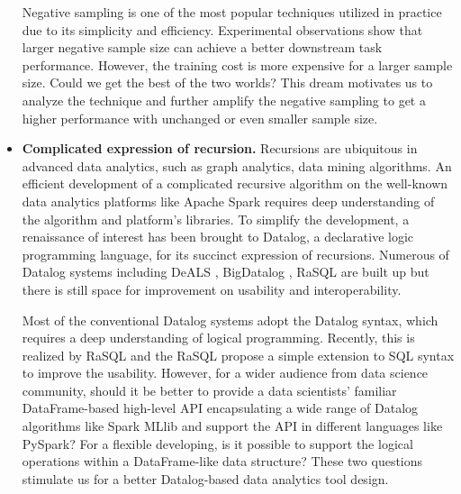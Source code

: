 \documentclass [PhD] {uclathes}
\begin{document}
\begin{itemize}
	Negative sampling is one of the most popular techniques utilized in practice due to its simplicity and efficiency. Experimental observations show that  larger negative sample size can achieve a better downstream task performance. However, the training cost is more expensive for a larger sample size. Could we get the best of the two worlds? This dream motivates us to analyze the technique and further amplify the negative sampling to get a higher performance with unchanged or even smaller sample size. 
	
	

	
	\item \textbf{Complicated expression of recursion.} Recursions are ubiquitous in advanced data analytics, such as graph analytics,  
	data mining algorithms. An efficient development of a complicated recursive algorithm on the well-known data analytics platforms like Apache Spark requires deep understanding of the algorithm and platform's libraries. To simplify the development,  a renaissance of interest has been brought to Datalog, a declarative logic programming language, for its succinct expression of recursions. Numerous of Datalog systems including DeALS \citep{yang2015parallel}, BigDatalog \citep{shkapsky2016big}, RaSQL \citep{gu2019rasql} are built up but there is still space for improvement on usability and interoperability.
	
	Most of the conventional Datalog systems adopt the Datalog syntax, which requires a deep understanding of logical programming. Recently, this is realized by RaSQL and the RaSQL propose a simple extension to  SQL syntax to improve the usability.  However, for a wider audience from data science community, should it be better to  provide a  data scientists' familiar DataFrame-based high-level API encapsulating a wide range of Datalog algorithms like Spark MLlib and support  the API in different languages like PySpark? For a flexible developing, is it possible to support the logical operations within a DataFrame-like  data structure? These two questions stimulate us for a better Datalog-based data analytics tool design.

\end{itemize}
\end{document}
